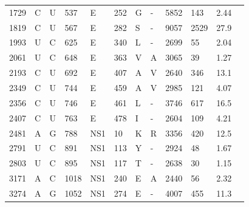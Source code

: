\begin{longtabu}{X[l]X[l]X[l]X[l]X[l]X[l]X[l]X[l]X[l]X[l]X[l]X[l]}
		1729     & C    & U            & 537               & E     & 252         & G                  & -                 & 5852           & 143              & 2.44   \\
		1819     & C    & U          & 567               & E     & 282         & S                  & -                 & 9057           & 2529             & 27.9   \\
		1993     & U    & C            & 625               & E     & 340         & L                  & -                 & 2699           & 55               & 2.04   \\
		2061   & U    & C            & 648               & E     & 363         & V                  & A               & 3065           & 39               & 1.27   \\
		2193     & C    & U            & 692               & E     & 407         & A                  & V               & 2640           & 346              & 13.1   \\
		2349     & C    & U            & 744               & E     & 459         & A                  & V               & 2985           & 121              & 4.07   \\
		2356     & C    & U            & 746               & E     & 461         & L                  & -                 & 3746           & 617              & 16.5   \\
		2407     & C    & U            & 763               & E     & 478         & I                  & -                 & 2604           & 109              & 4.21   \\
		2481     & A    & G            & 788               & NS1   & 10          & K                  & R               & 3356           & 420              & 12.5   \\
		2791     & U    & C            & 891               & NS1   & 113         & Y                  & -                 & 2924           & 48               & 1.67   \\
		2803     & U    & C            & 895               & NS1   & 117         & T                  & -                 & 2638           & 30               & 1.15   \\
		3171     & A    & C            & 1018              & NS1   & 240         & E                  & A               & 2440           & 56               & 2.32   \\
		3274     & A    & G          & 1052              & NS1   & 274         & E                  & -                 & 4007           & 455              & 11.3   \\

\end{longtabu}
